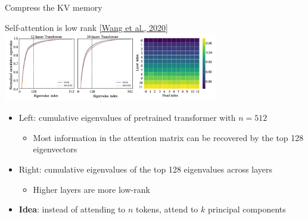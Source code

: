 \documentclass[usenames,dvipsnames,notes,11pt,aspectratio=169,hyperref={colorlinks=true, linkcolor=blue}]{beamer}
\begin{document}
\begin{frame}
    {Compress the KV memory}

    Self-attention is low rank \href{https://arxiv.org/pdf/2006.04768.pdf}{[Wang et al., 2020]}\\[1ex]
    {\centering
    \includegraphics[height=3cm]{figures/low-rank}}

    \begin{itemize}[<+->]
        \item Left: cumulative eigenvalues of pretrained transformer with $n=512$
            \begin{itemize}
                \item Most information in the attention matrix can be recovered by the top 128 eigenvectors %
            \end{itemize}
        \item Right: cumulative eigenvalues of the top 128 eigenvalues across layers 
            \begin{itemize}
                \item Higher layers are more low-rank 
            \end{itemize}
        \item \textbf{Idea}: instead of attending to $n$ tokens, attend to $k$ principal components 
    \end{itemize}
\end{frame}
\end{document}
